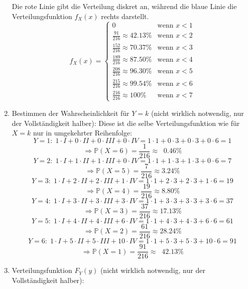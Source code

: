 \documentclass{scrreprt}
\begin{document}
\begin{uebsp}
\begin{Answer}
\begin{enumerate}[1.]
\begin{multicols}{2}
                Die rote Linie gibt die Verteilung diskret an, während die blaue Linie die Verteilungsfunktion $f_X(x)$ rechts darstellt.
            \columnbreak
            \[f_X(x) = \begin{cases} 
                        0 &\mbox{wenn } x < 1 \\
                        \frac{91}{216}\approx 42.13\% & \mbox{wenn } x < 2\\
                        \frac{152}{216}\approx 70.37\% & \mbox{wenn } x < 3\\
                        \frac{189}{216}\approx 87.50\% & \mbox{wenn } x < 4\\
                        \frac{208}{216}\approx 96.30\% & \mbox{wenn } x < 5\\
                        \frac{215}{216}\approx 99.54\% & \mbox{wenn } x < 6\\
                        \frac{216}{216}\approx 100\% & \mbox{wenn } x < 7 
                        \end{cases}\]
            \end{multicols}
        \item Bestimmen der Wahrscheinlichkeit für $Y=k$ (nicht wirklich notwendig, nur der Vollständigkeit halber):
            Diese ist die selbe Verteilungsfunktion wie für $X=k$ nur in umgekehrter Reihenfolge:
            \[Y=1:\;1\cdot I+0\cdot II+0\cdot III+0\cdot IV=1\cdot1+0\cdot3+0\cdot3+0\cdot6=1\]
                \[\Rightarrow\mathbb{P}(X=6)=\frac{1}{216}\approx \;\;0.46\%\]
            \[Y=2:\;1\cdot I+1\cdot II+1\cdot III+0\cdot IV=1\cdot1+1\cdot3+1\cdot3+0\cdot6=7\]
                \[\Rightarrow\mathbb{P}(X=5)=\frac{7}{216}\approx 3.24\%\]
            \[Y=3:\;1\cdot I+2\cdot II+2\cdot III+1\cdot IV=1\cdot1+2\cdot3+2\cdot3+1\cdot6=19\]
                \[\Rightarrow\mathbb{P}(X=4)=\frac{19}{216}\approx 8.80\%\]
            \[Y=4:\;1\cdot I+3\cdot II+3\cdot III+3\cdot IV=1\cdot1+3\cdot3+3\cdot3+3\cdot6=37\]
                \[\Rightarrow\mathbb{P}(X=3)=\frac{37}{216}\approx 17.13\%\]
            \[Y=5:\;1\cdot I+4\cdot II+4\cdot III+6\cdot IV=1\cdot1+4\cdot3+4\cdot3+6\cdot6=61\]
                \[\Rightarrow\mathbb{P}(X=2)=\frac{61}{216}\approx 28.24\%\]
            \[Y=6:\;1\cdot I+5\cdot II+5\cdot III+10\cdot IV=1\cdot1+5\cdot3+5\cdot3+10\cdot6=91\]
                \[\Rightarrow\mathbb{P}(X=1)=\frac{91}{216}\approx \;\;42.13\%\]
        \item Verteilungsfunktion $F_Y(y)$ (nicht wirklich notwendig, nur der Vollständigkeit halber):
            \begin{multicols}{2}
                \begin{tikzpicture}[scale=0.85]
                    
                \end{tikzpicture}


\end{multicols}
\end{enumerate}
\end{Answer}
\end{uebsp}
\end{document}
